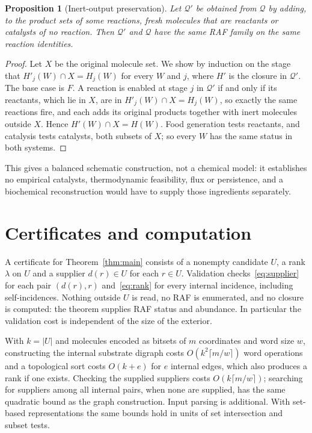 \documentclass[11pt,a4paper]{article}
\theoremstyle{plain}
\newtheorem{proposition}[theorem]{Proposition}
\theoremstyle{definition}
\theoremstyle{remark}
\newcommand{\QQ}{\mathcal Q}
\begin{document}
\begin{proposition}[Inert-output preservation]\label{prop:waste}
Let $\QQ'$ be obtained from $\QQ$ by adding, to the product sets of some reactions, fresh molecules that are reactants or catalysts of no reaction. Then $\QQ'$ and $\QQ$ have the same RAF family on the same reaction identities.
\end{proposition}
\begin{proof}
Let $X$ be the original molecule set. We show by induction on the stage that $H'_j(W)\cap X=H_j(W)$ for every $W$ and $j$, where $H'$ is the closure in $\QQ'$. The base case is $F$. A reaction is enabled at stage $j$ in $\QQ'$ if and only if its reactants, which lie in $X$, are in $H'_j(W)\cap X=H_j(W)$, so exactly the same reactions fire, and each adds its original products together with inert molecules outside $X$. Hence $H'(W)\cap X=H(W)$. Food generation tests reactants, and catalysis tests catalysts, both subsets of $X$; so every $W$ has the same status in both systems.
\end{proof}

This gives a balanced schematic construction, not a chemical model: it establishes no empirical catalysts, thermodynamic feasibility, flux or persistence, and a biochemical reconstruction would have to supply those ingredients separately.

\section{Certificates and computation}\label{sec:algorithms}

A certificate for Theorem~\ref{thm:main} consists of a nonempty candidate $U$, a rank $\lambda$ on $U$ and a supplier $d(r)\in U$ for each $r\in U$. Validation checks~\eqref{eq:supplier} for each pair $(d(r),r)$ and~\eqref{eq:rank} for every internal incidence, including self-incidences. Nothing outside $U$ is read, no RAF is enumerated, and no closure is computed: the theorem supplies RAF status and abundance. In particular the validation cost is independent of the size of the exterior.

With $k=|U|$ and molecules encoded as bitsets of $m$ coordinates and word size $w$, constructing the internal substrate digraph costs $O(k^2\lceil m/w\rceil)$ word operations and a topological sort costs $O(k+e)$ for $e$ internal edges, which also produces a rank if one exists. Checking the supplied suppliers costs $O(k\lceil m/w\rceil)$; searching for suppliers among all internal pairs, when none are supplied, has the same quadratic bound as the graph construction. Input parsing is additional. With set-based representations the same bounds hold in units of set intersection and subset tests.
\end{document}
